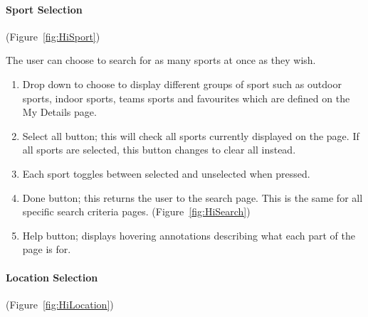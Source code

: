 \paragraph{Sport Selection} (Figure~\ref{fig:HiSport})


The user can choose to search for as many sports at once as they wish.
\begin{enumerate}
	\item Drop down to choose to display different groups of sport such as
		outdoor sports, indoor sports, teams sports and favourites which are
		defined on the My Details page.
	\item Select all button; this will check all sports currently displayed on
		the page. If all sports are selected, this button changes to clear all
		instead.
	\item Each sport toggles between selected and unselected when pressed.
	\item Done button; this returns the user to the search page. This is the
		same for all specific search criteria pages.
		(Figure~\ref{fig:HiSearch})
	\item Help button; displays hovering annotations describing what each part
		of the page is for.
\end{enumerate}

\paragraph{Location Selection} (Figure~\ref{fig:HiLocation})


